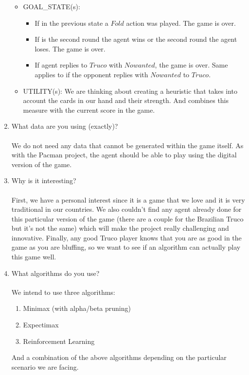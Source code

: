 \documentclass{article}
\begin{document}
\begin{enumerate}
\begin{itemize}
\begin{itemize}
	\end{itemize}
	\item GOAL\_STATE(s):
	\begin{itemize}
		\item If in the previous state a $Fold$ action was played. The game is over.
		\item If is the second round the agent wins or the second round the agent loses. The game is over.
		\item If agent replies to $Truco$ with $No wanted$, the game is over. Same applies to if the opponent replies with $No wanted$ to $Truco$.
	\end{itemize}
	\item UTILITY(s): We are thinking about creating a heuristic that takes into account the cards in our hand and their strength. And combines this measure with the current score in the game.
\end{itemize}

\item What data are you using (exactly)?
\\\\
We do not need any data that cannot be generated within the game itself. As with the Pacman project, the agent should be able to play using the digital version of the game.
\\
\item Why is it interesting?
\\\\
First, we have a personal interest since it is a game that we love and it is very traditional in our countries. We also couldn’t find any agent already done for this particular version of the game (there are a couple for the Brazilian Truco but it’s not the same) which will make the project really challenging and innovative. Finally, any good Truco player knows that you are as good in the game as you are bluffing, so we want to see if an algorithm can actually play this game well.
\item What algorithms do you use? 
\\\\
We intend to use three algorithms:
\begin{enumerate}
	\item Minimax (with alpha/beta pruning)
	\item Expectimax
	\item Reinforcement Learning
\end{enumerate}
And a combination of the above algorithms depending on the particular scenario we are facing.



\end{enumerate}
\end{document}
